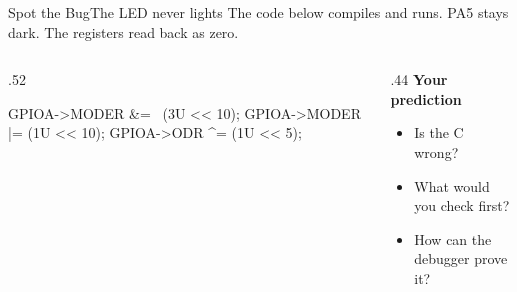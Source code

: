 \documentclass[9pt,aspectratio=169,xcolor=table]{beamer}
\begin{document}
{\beamerextras
\begin{frame}[fragile]{Spot the Bug}{The LED never lights}
    \leavevmode
    The code below compiles and runs. PA5 stays dark. The registers read back as zero.

    \vspace{2mm}
    \begin{columns}[T]
    \begin{column}{.52\textwidth}
\begin{cc}[basicstyle=\ttfamily\small]
GPIOA->MODER &= ~(3U << 10);
GPIOA->MODER |=  (1U << 10);
GPIOA->ODR   ^=  (1U << 5);
\end{cc}
    \end{column}
    \begin{column}{.44\textwidth}
        \textbf{Your prediction}
        {\small
        \begin{itemize}\itemsep2pt
            \item Is the C wrong?
            \item What would you check first?
            \item How can the debugger prove it?
        \end{itemize}}
    \end{column}
    \end{columns}

    \vspace{2mm}
\end{frame}
}
\end{document}
